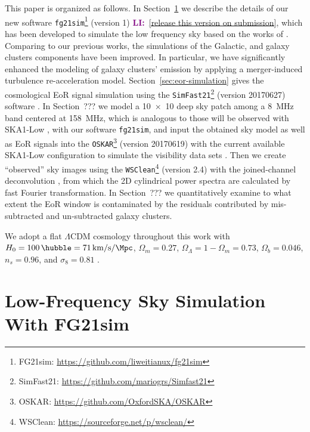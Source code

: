 \documentclass[modern]{aastex61}
\newcommand{\lcdm}{$\Lambda$CDM}
\newcommand{\LI}[1]{\textcolor{purple}{\textbf{LI:}}~\uline{#1}}
\begin{document}
This paper is organized as follows.
In Section~\ref{sec:fg-simu} we describe the details of our new software
\texttt{fg21sim}\footnote{FG21sim: \url{https://github.com/liweitianux/fg21sim}}
(version 1) \LI{[release this version on submission]},
which has been developed to simulate the low frequency sky based on the
works of \citet{wang2010,wang2013}.
Comparing to our previous works, the simulations of the Galactic,
and galaxy clusters components have been improved.
In particular, we have significantly enhanced the modeling of galaxy clusters'
emission by applying a merger-induced turbulence re-acceleration model.
Section~\ref{sec:eor-simulation} gives the cosmological EoR signal simulation
using the \texttt{SimFast21}\footnote{SimFast21:
  \url{https://github.com/mariogrs/Simfast21}} (version 20170627)
software \citep{santos2010,hassan2016}.
In Section~??? we model a \SI[product-units=power]{10 x 10}{\deg} deep sky
patch among a \SI{8}{\MHz} band centered at \SI{158}{\MHz}, which is
analogous to those will be observed with SKA1-Low
\citep[see][for updated SKA observing strategies]{koopmans2015rev},
with our software \texttt{fg21sim},
and input the obtained sky model as well as EoR signals into the
\texttt{OSKAR}\footnote{OSKAR: \url{https://github.com/OxfordSKA/OSKAR}}
(version 20170619) with the current available SKA1-Low configuration to
simulate the visibility data sets \citep{mort2010}.
Then we create \enquote{observed} sky images using the
\texttt{WSClean}\footnote{WSClean: \url{https://sourceforge.net/p/wsclean/}}
(version 2.4) with the joined-channel deconvolution
\citep{offringa2014,offringa2017}, from which the 2D cylindrical power spectra
are calculated by fast Fourier transformation.
In Section~??? we quantitatively examine to what extent the EoR window is
contaminated by the residuals contributed by mis-subtracted and un-subtracted
galaxy clusters.

We adopt a flat \lcdm{} cosmology throughout this work with
$H_0 = \SI{100}{\hubble} = \SI{71}{\km\per\second\per\Mpc}$,
$\Omega_m = 0.27$, $\Omega_{\Lambda} = 1 - \Omega_m = 0.73$,
$\Omega_b = 0.046$, $n_s = 0.96$, and $\sigma_8 = 0.81$
\citep{komatsu2011}.


\section{Low-Frequency Sky Simulation With FG21sim}
\label{sec:fg-simu}
\end{document}
